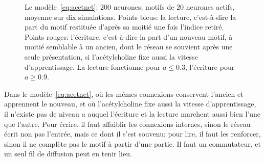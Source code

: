 \begin{figure}[t]
\centering
{}
\caption{Le modèle~\eqref{eq:acetnet}: $200$ neurones, motifs de $20$ neurones actifs, moyenne sur dix simulations. Points bleus: la lecture, c'est-à-dire la part du motif restituée d'après sa moitié une fois l'indice retiré. Points rouges: l'écriture, c'est-à-dire la part d'un nouveau motif, à moitié semblable à un ancien, dont le réseau se souvient après une seule présentation, si l'acétylcholine fixe aussi la vitesse d'apprentissage. La lecture fonctionne pour $a\le0.3$, l'écriture pour $a\ge0.9$.}
\label{fig:acetsim}
\end{figure}

\begin{keyblock}
\begin{proposition}
\label{prop:writeread}
Dans le modèle~\eqref{eq:acetnet}, où les mêmes connexions conservent l'ancien et apprennent le nouveau, et où l'acétylcholine fixe aussi la vitesse d'apprentissage, il n'existe pas de niveau $a$ auquel l'écriture et la lecture marchent aussi bien l'une que l'autre. Pour écrire, il faut affaiblir les connexions internes, sinon le réseau écrit non pas l'entrée, mais ce dont il s'est souvenu; pour lire, il faut les renforcer, sinon il ne complète pas le motif à partir d'une partie. Il faut un commutateur, et un seul fil de diffusion peut en tenir lieu.
\end{proposition}
\end{keyblock}

